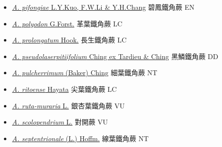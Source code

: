 \begin{itemize}
\begin{itemize}
        \item[] \href{http://www.theplantlist.org/tpl1.1/search?q=Asplenium+pifongiae}{\textit{A. pifongiae} L.Y.Kuo, F.W.Li \& Y.H.Chang}   碧鳳鐵角蕨 EN
        \item[] \href{http://www.theplantlist.org/tpl1.1/search?q=Asplenium+polyodon}{\textit{A. polyodon} G.Forst.}     革葉鐵角蕨 LC
        \item[] \href{http://www.theplantlist.org/tpl1.1/search?q=Asplenium+prolongatum}{\textit{A. prolongatum} Hook.}   長生鐵角蕨 LC
        \item[] \href{http://www.theplantlist.org/tpl1.1/search?q=Asplenium+pseudolaserpitiifolium}{\textit{A. pseudolaserpitiifolium} Ching ex Tardieu \& Ching}   黑鱗鐵角蕨 DD
        \item[] \href{http://www.theplantlist.org/tpl1.1/search?q=Asplenium+pulcherrimum}{\textit{A. pulcherrimum} (Baker) Ching}   細葉鐵角蕨 NT
        \item[] \href{http://www.theplantlist.org/tpl1.1/search?q=Asplenium+ritoense}{\textit{A. ritoense} Hayata}   尖葉鐵角蕨 LC
        \item[] \href{http://www.theplantlist.org/tpl1.1/search?q=Asplenium+ruta-muraria}{\textit{A. ruta-muraria} L.}   銀杏葉鐵角蕨 VU
        \item[] \href{http://www.theplantlist.org/tpl1.1/search?q=Asplenium+scolopendrium}{\textit{A. scolopendrium} L.}   對開蕨 VU
        \item[] \href{http://www.theplantlist.org/tpl1.1/search?q=Asplenium+septentrionale}{\textit{A. septentrionale} (L.) Hoffm.}   線葉鐵角蕨 NT

\end{itemize}
\end{itemize}
